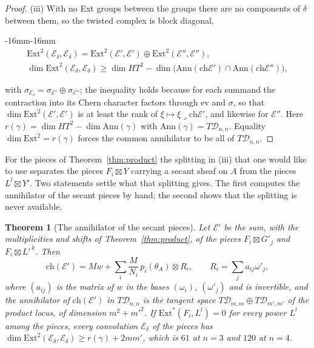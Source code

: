 \documentclass[11pt,reqno]{amsart}
\newenvironment{widetext}{\begin{adjustwidth}{-16mm}{-16mm}}{\end{adjustwidth}}
\numberwithin{equation}{section}
\theoremstyle{plain}
\newtheorem{theorem}{Theorem}[section]
\theoremstyle{definition}
\newcommand{\Ext}{\mathrm{Ext}}
\newcommand{\ch}{\mathrm{ch}}
\newcommand{\cD}{\mathcal{D}}
\begin{document}
\begin{proof}
(iii) With no Ext groups between the groups there are no components of $\delta$ between them, so the twisted complex is block diagonal,
\begin{widetext}
\begin{equation}\label{eq:blockdiag}
\begin{gathered}
\Ext^{2}(\mathcal{E}_{\delta},\mathcal{E}_{\delta})=\Ext^{2}(\mathcal{E}',\mathcal{E}')\oplus\Ext^{2}(\mathcal{E}'',\mathcal{E}''),\\
\dim\Ext^{2}(\mathcal{E}_{\delta},\mathcal{E}_{\delta})\ge\dim HT^{2}-\dim\bigl(\mathrm{Ann}(\ch\mathcal{E}')\cap\mathrm{Ann}(\ch\mathcal{E}'')\bigr),
\end{gathered}
\end{equation}
\end{widetext}
with $\sigma_{\mathcal{E}_{\delta}}=\sigma_{\mathcal{E}'}\oplus\sigma_{\mathcal{E}''}$; the inequality holds because for each summand the contraction into its Chern character factors through $\mathrm{ev}$ and $\sigma$, so that $\dim\Ext^{2}(\mathcal{E}',\mathcal{E}')$ is at least the rank of $\xi\mapsto\xi\lrcorner\ch\mathcal{E}'$, and likewise for $\mathcal{E}''$. Here $r(\gamma)=\dim HT^{2}-\dim\mathrm{Ann}(\gamma)$ with $\mathrm{Ann}(\gamma)=T\cD_{n,n}$. Equality $\dim\Ext^{2}=r(\gamma)$ forces the common annihilator to be all of $T\cD_{n,n}$.
\end{proof}

For the pieces of Theorem~\ref{thm:product} the splitting in (iii) that one would like to use separates the pieces $F_{i}\boxtimes Y$ carrying a secant sheaf on $A$ from the pieces $L^{l}\boxtimes Y'$. Two statements settle what that splitting gives. The first computes the annihilator of the secant pieces by hand; the second shows that the splitting is never available.

\begin{theorem}[The annihilator of the secant pieces]\label{thm:annihilator}
Let $\mathcal{E}'$ be the sum, with the multiplicities and shifts of Theorem~\ref{thm:product}, of the pieces $F_{i}\boxtimes G'_{j}$ and $F_{i}\boxtimes L'^{\,k}$. Then
\begin{equation}\label{eq:chEprime}
\ch(\mathcal{E}')=Mw+\sum_{i}\frac{M}{N_{i}}\,p_{i}(\theta_{A})\otimes R_{i},\qquad R_{i}=\sum_{j}a_{ij}\omega'_{j},
\end{equation}
where $(a_{ij})$ is the matrix of $w$ in the bases $(\omega_{i})$, $(\omega'_{j})$ and is invertible, and the annihilator of $\ch(\mathcal{E}')$ in $T\cD_{n,n}$ is the tangent space $T\cD_{m,m}\oplus T\cD_{m',m'}$ of the product locus, of dimension $m^{2}+m'^{2}$. If $\Ext^{*}(F_{i},L^{l})=0$ for every power $L^{l}$ among the pieces, every convolution $\mathcal{E}_{\delta}$ of the pieces has $\dim\Ext^{2}(\mathcal{E}_{\delta},\mathcal{E}_{\delta})\ge r(\gamma)+2mm'$, which is $61$ at $n=3$ and $120$ at $n=4$.
\end{theorem}
\end{document}
